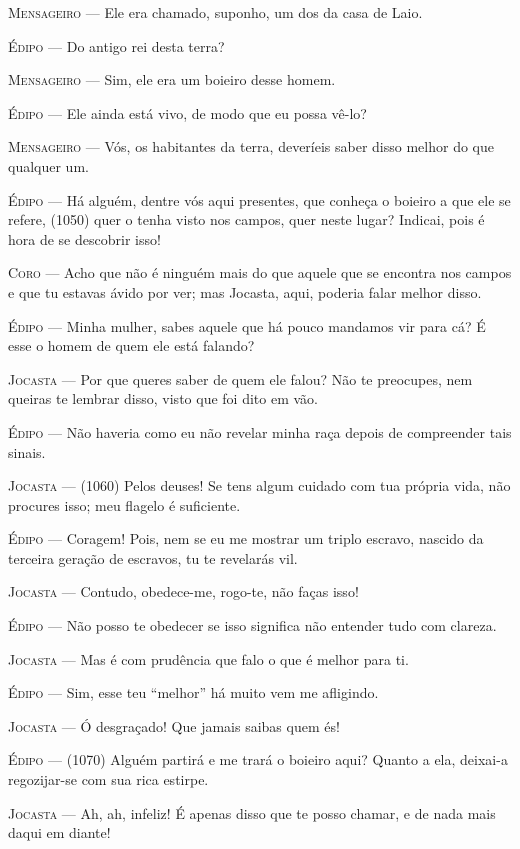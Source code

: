 \textsc{Mensageiro} --- Ele era chamado, suponho, um dos da casa de Laio.

\textsc{Édipo} --- Do antigo rei desta terra?

\textsc{Mensageiro} --- Sim, ele era um boieiro desse homem.

\textsc{Édipo} --- Ele ainda está vivo, de modo que eu possa vê-lo?

\textsc{Mensageiro} --- Vós, os habitantes da terra, deveríeis saber disso melhor do que
qualquer um.

\textsc{Édipo} --- Há alguém, dentre vós aqui presentes, que conheça o boieiro a que ele se
refere, (1050) quer o tenha visto nos campos, quer neste lugar? Indicai,
pois é hora de se descobrir isso!

\textsc{Coro} --- Acho que não é ninguém mais do que aquele que se encontra nos campos e
que tu estavas ávido por ver; mas Jocasta, aqui, poderia falar melhor
disso.

\textsc{Édipo} --- Minha mulher, sabes aquele que há pouco mandamos vir para cá? É esse o
homem de quem ele está falando?

\textsc{Jocasta} --- Por que queres saber de quem ele falou? Não te preocupes, nem queiras te
lembrar disso, visto que foi dito em vão.

\textsc{Édipo} --- Não haveria como eu não revelar minha raça depois de compreender tais
sinais.

\textsc{Jocasta} --- (1060) Pelos deuses! Se tens algum cuidado com tua própria vida, não
procures isso; meu flagelo é suficiente.

\textsc{Édipo} --- Coragem! Pois, nem se eu me mostrar um triplo escravo, nascido da
terceira geração de escravos, tu te revelarás vil.

\textsc{Jocasta} --- Contudo, obedece-me, rogo-te, não faças isso!

\textsc{Édipo} --- Não posso te obedecer se isso significa não entender tudo com clareza.

\textsc{Jocasta} --- Mas é com prudência que falo o que é melhor para ti.

\textsc{Édipo} --- Sim, esse teu ``melhor'' há muito vem me afligindo.

\textsc{Jocasta} --- Ó desgraçado! Que jamais saibas quem és!

\textsc{Édipo} --- (1070) Alguém partirá e me trará o boieiro aqui? Quanto a ela, deixai-a
regozijar-se com sua rica estirpe.

\textsc{Jocasta} --- Ah, ah, infeliz! É apenas disso que te posso chamar, e de nada mais
daqui em diante!

